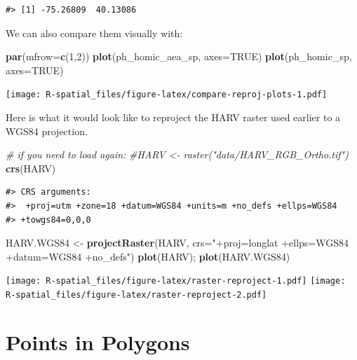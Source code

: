\documentclass[]{book}
\newenvironment{Shaded}{\begin{snugshade}}{\end{snugshade}}
\newcommand{\KeywordTok}[1]{\textcolor[rgb]{0.13,0.29,0.53}{\textbf{#1}}}
\newcommand{\DataTypeTok}[1]{\textcolor[rgb]{0.13,0.29,0.53}{#1}}
\newcommand{\DecValTok}[1]{\textcolor[rgb]{0.00,0.00,0.81}{#1}}
\newcommand{\StringTok}[1]{\textcolor[rgb]{0.31,0.60,0.02}{#1}}
\newcommand{\CommentTok}[1]{\textcolor[rgb]{0.56,0.35,0.01}{\textit{#1}}}
\newcommand{\OtherTok}[1]{\textcolor[rgb]{0.56,0.35,0.01}{#1}}
\newcommand{\NormalTok}[1]{#1}
\theoremstyle{definition}
\theoremstyle{definition}
\theoremstyle{definition}
\theoremstyle{remark}
\begin{document}
\begin{verbatim}
#> [1] -75.26809  40.13086
\end{verbatim}

We can also compare them visually with:

\begin{Shaded}
\begin{Highlighting}[]
\KeywordTok{par}\NormalTok{(}\DataTypeTok{mfrow=}\KeywordTok{c}\NormalTok{(}\DecValTok{1}\NormalTok{,}\DecValTok{2}\NormalTok{)) }
\KeywordTok{plot}\NormalTok{(ph_homic_aea_sp, }\DataTypeTok{axes=}\OtherTok{TRUE}\NormalTok{)}
\KeywordTok{plot}\NormalTok{(ph_homic_sp, }\DataTypeTok{axes=}\OtherTok{TRUE}\NormalTok{)}
\end{Highlighting}
\end{Shaded}

\texttt{[image: R-spatial\_files/figure-latex/compare-reproj-plots-1.pdf]}

Here is what it would look like to reproject the HARV raster used
earlier to a WGS84 projection.

\begin{Shaded}
\begin{Highlighting}[]
\CommentTok{# if you need to load again:}
\CommentTok{#HARV <- raster("data/HARV_RGB_Ortho.tif")}
\KeywordTok{crs}\NormalTok{(HARV)}
\end{Highlighting}
\end{Shaded}

\begin{verbatim}
#> CRS arguments:
#>  +proj=utm +zone=18 +datum=WGS84 +units=m +no_defs +ellps=WGS84
#> +towgs84=0,0,0
\end{verbatim}

\begin{Shaded}
\begin{Highlighting}[]
\NormalTok{HARV.WGS84 <-}\StringTok{ }\KeywordTok{projectRaster}\NormalTok{(HARV, }\DataTypeTok{crs=}\StringTok{"+proj=longlat +ellps=WGS84 +datum=WGS84 +no_defs"}\NormalTok{)}
\KeywordTok{plot}\NormalTok{(HARV); }\KeywordTok{plot}\NormalTok{(HARV.WGS84)}
\end{Highlighting}
\end{Shaded}

\texttt{[image: R-spatial\_files/figure-latex/raster-reproject-1.pdf]}
\texttt{[image: R-spatial\_files/figure-latex/raster-reproject-2.pdf]}

\section{Points in Polygons}\label{points-in-polygons}
\end{document}
